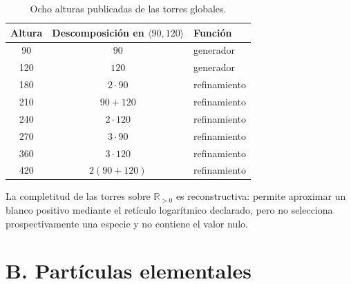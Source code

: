 \begin{table}[htbp]
\centering
\caption{Ocho alturas publicadas de las torres globales.}
\label{tab:ocho-torres-globales}
\begin{tabular}{@{}ccl@{}}
\toprule
Altura & Descomposición en \(\langle90,120\rangle\) & Función\\
\midrule
90&\(90\)&generador\\
120&\(120\)&generador\\
180&\(2\cdot90\)&refinamiento\\
210&\(90+120\)&refinamiento\\
240&\(2\cdot120\)&refinamiento\\
270&\(3\cdot90\)&refinamiento\\
360&\(3\cdot120\)&refinamiento\\
420&\(2(90+120)\)&refinamiento\\
\bottomrule
\end{tabular}
\end{table}

La completitud de las torres sobre \(\mathbb R_{>0}\) es reconstructiva:
permite aproximar un blanco positivo mediante el retículo logarítmico
declarado, pero no selecciona prospectivamente una especie y no contiene el
valor nulo.

\section{B. Partículas elementales}

